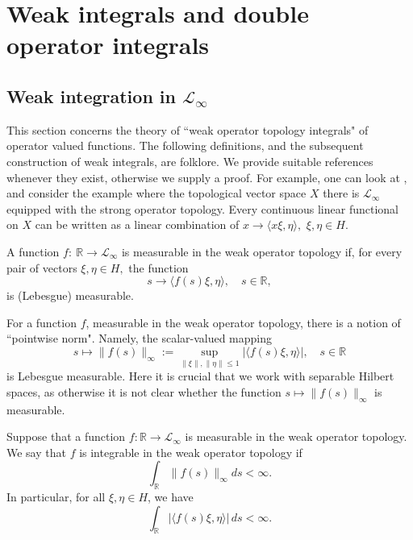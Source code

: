 \section{Weak integrals and double operator integrals}
    
\subsection{Weak integration in $\mathcal{L}_{\infty}$}\label{weak int}
    This section concerns the theory of ``weak operator topology integrals" of operator valued functions. The following definitions, and the subsequent construction of weak integrals, are folklore. We provide suitable references whenever they
    exist, otherwise we supply a proof. For example, one can look at \cite[Definition 3.26]{rudin}, and consider the example where the topological vector space $X$ there is $\mathcal{L}_{\infty}$ equipped with the strong operator topology. Every
    continuous linear functional on $X$ can be written as a linear combination of $x\to\langle x\xi,\eta\rangle,$ $\xi,\eta\in H.$

    \begin{defi}\label{weak meas def} 
        A function $f:\ \mathbb{R}\to \mathcal{L}_{\infty}$ is measurable in the weak operator topology if, for every pair of vectors $\xi,\eta\in H,$ the function
        $$s\to\langle f(s)\xi,\eta\rangle,\quad s\in\mathbb{R},$$
        is (Lebesgue) measurable.
    \end{defi}
    
    For a function $f$, measurable in the weak operator topology, there is a notion of ``pointwise norm". 
    Namely, the scalar-valued mapping
    \begin{equation*}
        s\mapsto \|f(s)\|_\infty := \sup_{\|\xi\|,\|\eta\| \leq 1} |\langle f(s)\xi,\eta\rangle|, \quad s \in \mathbb{R}
    \end{equation*}
    is Lebesgue measurable. { Here it is crucial that we work with separable Hilbert spaces, as otherwise it is not clear whether the function $s\mapsto \|f(s)\|_\infty$ is measurable.}

    Suppose that a function $f:\mathbb{R}\to\mathcal{L}_{\infty}$ is measurable in the weak operator topology. We say that $f$ is integrable in the weak operator topology if
    \begin{equation}\label{necessary-condition}
        \int_{\mathbb{R}}\|f(s)\|_{\infty}ds < \infty.
    \end{equation}
    In particular, for all $\xi,\eta \in H$, we have
    \begin{equation*}
        \int_{\mathbb{R}} |\langle f(s)\xi,\eta\rangle|\,ds < \infty.
    \end{equation*}
    
